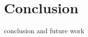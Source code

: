 \section{Conclusion}
\label{sec:Conclusion}

conclusion and future work \cite{braun_classification_2014}
